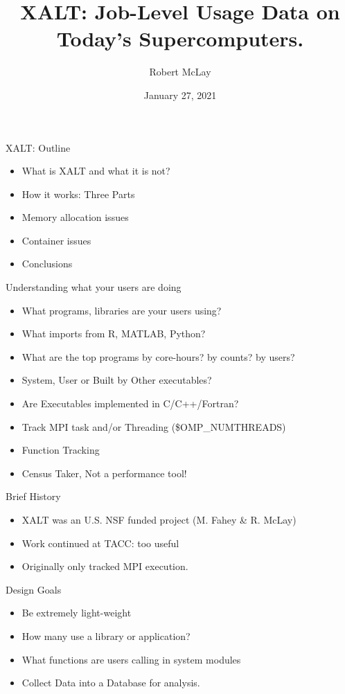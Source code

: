 \documentclass{beamer}
\begin{document}
\title[XALT]{XALT: Job-Level Usage Data on Today's Supercomputers.}
\author{Robert McLay} 
\date{January 27, 2021} 

\frame{\titlepage} 

\begin{frame}{XALT: Outline}
  \begin{itemize}
    \item What is XALT and what it is not?
    \item How it works: Three Parts
    \item Memory allocation issues
    \item Container issues
    \item Conclusions
  \end{itemize}
\end{frame}

\begin{frame}{Understanding what your users are doing}
  \begin{itemize}
    \item What programs, libraries are your users using?
    \item What imports from R, MATLAB, Python?
    \item What are the top programs by core-hours? by counts? by users?
    \item System, User or Built by Other executables?
    \item Are Executables implemented in C/C++/Fortran?
    \item Track MPI task and/or Threading (\$OMP\_NUMTHREADS)
    \item Function Tracking
    \item Census Taker, Not a performance tool!
  \end{itemize}
\end{frame}

\begin{frame}{Brief History}
  \begin{itemize}
    \item XALT was an U.S. NSF funded project (M. Fahey \& R. McLay)
    \item Work continued at TACC: too useful
    \item Originally only tracked MPI execution.
  \end{itemize}
\end{frame}

\begin{frame}{Design Goals}
  \begin{itemize}
    \item Be extremely light-weight
    \item How many use a library or application?
    \item What functions are users calling in system modules
    \item Collect Data into a Database for analysis.
  \end{itemize}
\end{frame}
\end{document}
